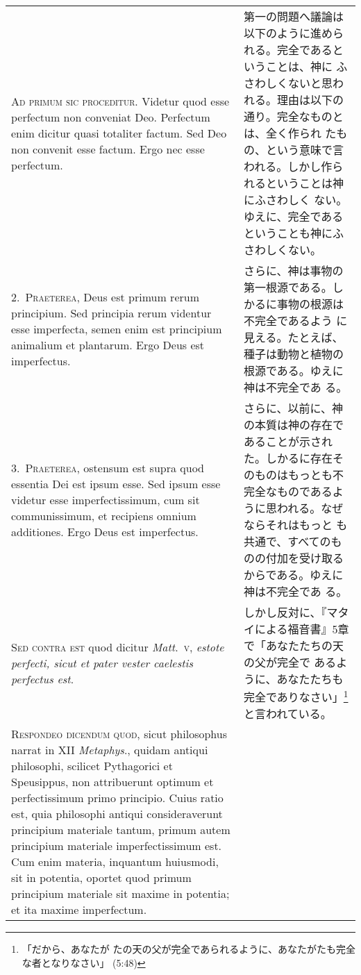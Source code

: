 \documentclass[10pt]{jsarticle}
\begin{document}
\begin{longtable}{p{21em}p{21em}}

{\huge A}{\scshape d primum sic proceditur}. Videtur quod esse
 perfectum non conveniat Deo. Perfectum enim dicitur quasi totaliter
 factum. Sed Deo non convenit esse factum. Ergo nec esse perfectum.

&

第一の問題へ議論は以下のように進められる。完全であるということは、神に
ふさわしくないと思われる。理由は以下の通り。完全なものとは、全く作られ
たもの、という意味で言われる。しかし作られるということは神にふさわしく
ない。ゆえに、完全であるということも神にふさわしくない。

\\


2.~{\scshape Praeterea}, Deus est primum rerum principium. Sed
principia rerum videntur esse imperfecta, semen enim est principium
animalium et plantarum. Ergo Deus est imperfectus.

&

さらに、神は事物の第一根源である。しかるに事物の根源は不完全であるよう
に見える。たとえば、種子は動物と植物の根源である。ゆえに神は不完全であ
る。

\\


3.~{\scshape Praeterea}, ostensum est supra quod essentia Dei est
ipsum esse. Sed ipsum esse videtur esse imperfectissimum, cum sit
communissimum, et recipiens omnium additiones. Ergo Deus est
imperfectus.  

&

さらに、以前に、神の本質は神の存在であることが示された。しかるに存在そ
のものはもっとも不完全なものであるように思われる。なぜならそれはもっと
も共通で、すべてのものの付加を受け取るからである。ゆえに神は不完全であ
る。


\\

 {\scshape Sed contra est} quod dicitur {\itshape Matt}.~{\scshape v},
 {\itshape estote perfecti, sicut et pater vester caelestis perfectus
 est}.
&

しかし反対に、『マタイによる福音書』5章で「あなたたちの天の父が完全で
あるように、あなたたちも完全でありなさい」\footnote{「だから、あなたが
たの天の父が完全であられるように、あなたがたも完全な者となりなさい」
(5:48)}と言われている。

\\


{\scshape Respondeo dicendum quod}, sicut philosophus narrat in XII
{\itshape Metaphys}., quidam antiqui philosophi, scilicet Pythagorici
et Speusippus, non attribuerunt optimum et perfectissimum primo
principio. Cuius ratio est, quia philosophi antiqui consideraverunt
principium materiale tantum, primum autem principium materiale
imperfectissimum est. Cum enim materia, inquantum huiusmodi, sit in
potentia, oportet quod primum principium materiale sit maxime in
potentia; et ita maxime imperfectum.


\end{longtable}
\end{document}
